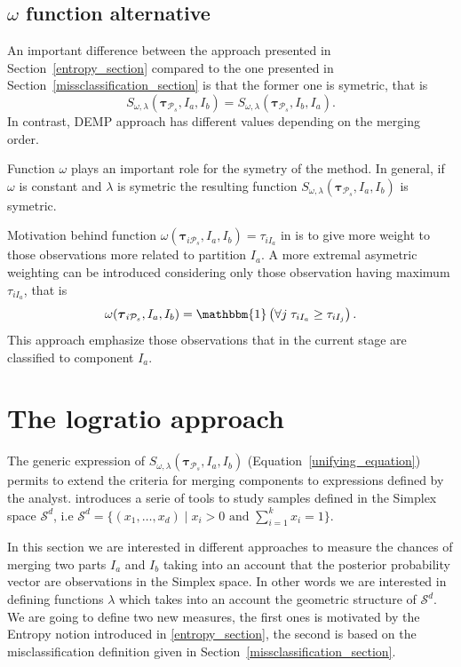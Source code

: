 \documentclass[submit]{smj}
\theoremstyle{definition}
\newcommand{\m}[1]{\boldsymbol{#1}}
\begin{document}
\subsection{$\omega$ function alternative}


An important difference between the approach presented in Section~\ref{entropy_section} \citep{baudry2010combining} compared to the one presented in Section~\ref{missclassification_section} \citep{hennig2010methods} is that the former one is symetric, that is
\[
S_{\omega, \lambda}( \m\tau_{\mathcal{P}_s},  I_a,  I_b) = S_{\omega, \lambda}( \m\tau_{\mathcal{P}_s},  I_b,  I_a).
\]
In contrast, DEMP approach has different values depending on the merging order.

Function $\omega$ plays an important role for the symetry of the method. In general, if $\omega$ is constant and $\lambda$ is symetric the resulting function $S_{\omega, \lambda}( \m\tau_{\mathcal{P}_s},  I_a,  I_b)$ is symetric.

Motivation behind function $\omega(\m\tau_{i \mathcal{P}_s},  I_a,  I_b) = \tau_{iI_a}$ in \cite{hennig2010methods} is to give more weight to those observations more related to partition $I_a$. A more extremal asymetric weighting can be introduced considering only those observation having maximum $ \tau_{iI_a}$, that is
\[
\omega(\m\tau_{i \mathcal{P}_s},  I_a,  I_b) = \mathbbm{1}\left( \forall j\; \tau_{i I_{a}} \geq \tau_{iI_j} \right).
\]
This approach emphasize those observations that in the current stage are classified to component $I_a$.


\section{The logratio approach}\label{logratio_section}

The generic expression of $S_{\omega, \lambda}( \m\tau_{\mathcal{P}_s},  I_a,  I_b)$ (Equation~\ref{unifying_equation}) permits to extend the criteria for merging components to expressions defined by the analyst. \cite{aitchison1986statistical} introduces a serie of tools to study samples defined in the Simplex space $\mathcal{S}^d$, i.e $\mathcal{S}^d = \{ (x_1,\dots, x_d) \;|\; x_i > 0 \text{ and } \sum_{i=1}^k x_i = 1 \}$. 

In this section we are interested in different approaches to measure the chances of merging two parts $I_a$ and $I_b$ taking into an account that the posterior probability vector are observations in the Simplex space. In other words we are interested in defining functions $\lambda$ which takes into an account the geometric structure of $\mathcal{S}^d$. We are going to define two new measures, the first ones is motivated by the Entropy notion introduced in \ref{entropy_section}, the second is based on the misclassification definition given in Section~\ref{missclassification_section}.
\end{document}
